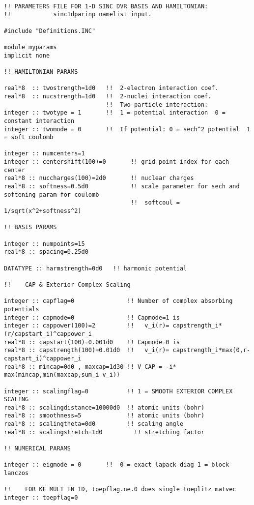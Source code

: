 \begin{verbatim}

!! PARAMETERS FILE FOR 1-D SINC DVR BASIS AND HAMILTONIAN:
!!            sinc1dparinp namelist input.

#include "Definitions.INC"

module myparams
implicit none

!! HAMILTONIAN PARAMS

real*8  :: twostrength=1d0   !!  2-electron interaction coef.
real*8  :: nucstrength=1d0   !!  2-nuclei interaction coef.
                             !!  Two-particle interaction:
integer :: twotype = 1       !!  1 = potential interaction  0 = constant interaction
integer :: twomode = 0       !!  If potential: 0 = sech^2 potential  1 = soft coulomb

integer :: numcenters=1
integer :: centershift(100)=0       !! grid point index for each center
real*8 :: nuccharges(100)=2d0       !! nuclear charges
real*8 :: softness=0.5d0            !! scale parameter for sech and softening param for coulomb
                                    !!  softcoul = 1/sqrt(x^2+softness^2)

!! BASIS PARAMS

integer :: numpoints=15
real*8 :: spacing=0.25d0

DATATYPE :: harmstrength=0d0   !! harmonic potential

!!    CAP & Exterior Complex Scaling

integer :: capflag=0               !! Number of complex absorbing potentials
integer :: capmode=0               !! Capmode=1 is 
integer :: cappower(100)=2         !!   v_i(r)= capstrength_i*(r/capstart_i)^cappower_i
real*8 :: capstart(100)=0.001d0    !! Capmode=0 is    
real*8 :: capstrength(100)=0.01d0  !!   v_i(r)= capstrength_i*max(0,r-capstart_i)^cappower_i
real*8 :: mincap=0d0 , maxcap=1d30 !! V_CAP = -i* max(mincap,min(maxcap,sum_i v_i))

integer :: scalingflag=0           !! 1 = SMOOTH EXTERIOR COMPLEX SCALING
real*8 :: scalingdistance=10000d0  !! atomic units (bohr)
real*8 :: smoothness=5             !! atomic units (bohr)
real*8 :: scalingtheta=0d0         !! scaling angle
real*8 :: scalingstretch=1d0         !! stretching factor

!! NUMERICAL PARAMS

integer :: eigmode = 0       !!  0 = exact lapack diag 1 = block lanczos

!!    FOR KE MULT IN 1D, toepflag.ne.0 does single toeplitz matvec
integer :: toepflag=0


\end{verbatim}
